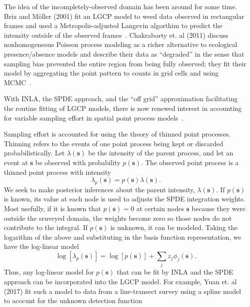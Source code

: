 \documentclass[]{interact}
\begin{document}
The idea of the incompletely-observed domain has been around for some time.
Brix and M\"{o}ller (2001) fit an LGCP model to weed data observed in
rectangular frames and used a Metropolis-adjusted Langevin algorthim
to predict the intensity outside of the observed frames~\cite{brixmoeller}.
Chakraborty et. al (2011) discuss nonhomogeneous Poisson process modeling as
a richer alternative to ecological presence/absence models and describe their
data as ``degraded'' in the sense that sampling bias prevented the entire
region from being fully observed; they fit their model by aggregating the
point pattern to counts in grid cells and using MCMC~\cite{chakrabortyetal}.

With INLA, the SPDE approach, and the ``off grid'' approximation
facilitating the routine fitting of LGCP models, there is now renewed interest
in accounting for variable sampling effort in spatial point process
models~\cite{simpsonetal,yuanetal}.

Sampling effort is accounted for using the theory of thinned point processes.
Thinning refers to the events of one point process being kept or discarded
probabilistically. Let \(\lambda(\mathbf{s})\) be the intensity of the parent
process, and let an event at \(\mathbf{s}\) be observed with probability
\(p(\mathbf{s})\). The observed point process is a thinned point process with
intensity
\begin{displaymath}
\lambda_{p}(\mathbf{s}) = p(\mathbf{s}) \lambda(\mathbf{s}).
\end{displaymath}
We seek to make posterior inferences about the parent intensity,
 \(\lambda(\mathbf{s})\). If \(p(\mathbf{s})\) is known, its value at each node
is used to adjusts the SPDE integration weights. Most usefully, if it is known
that \(p(\mathbf{s}) = 0\) at certain nodes \(\mathbf{s}\) because they were
outside the sruveyed domain, the weights become zero so those nodes do not
contribute to the integral. If \(p(\mathbf{s})\) is unknown, it can be modeled.
Taking the logarithm of the above and substituting in the basis function
representation, we have the log-linear model
\begin{displaymath}
\log\left[\lambda_{p}(\mathbf{s})\right]
= \log\left[p(\mathbf{s})\right] + \sum_{j} z_{j} \phi_{j}(\mathbf{s}).
\end{displaymath}
Thus, any log-linear model for \(p(\mathbf{s})\) that can be fit by INLA and
the SPDE approach can be incorporated into the LGCP model. For example, Yuan
et. al (2017) fit such a model to data from a line-transect survey using a
spline model to acocunt for the unknown detection function~\cite{yuanetal}
\end{document}
